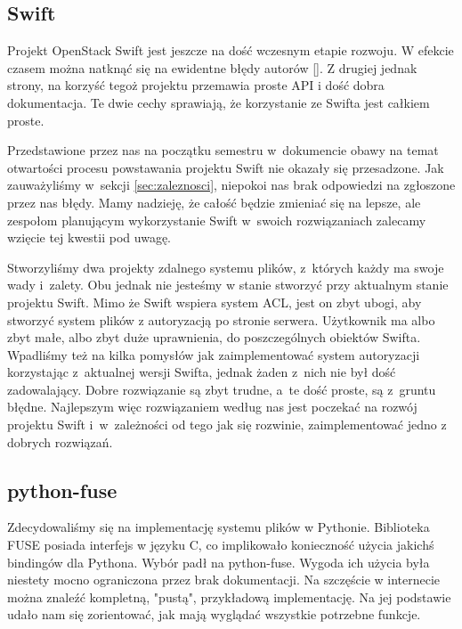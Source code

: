 \subsection{Swift}

Projekt OpenStack Swift jest jeszcze na dość wczesnym etapie rozwoju. W
efekcie czasem można natknąć się na ewidentne błędy autorów []. Z drugiej jednak strony, na korzyść tegoż projektu przemawia proste
API i dość dobra dokumentacja. Te dwie cechy sprawiają, że korzystanie ze
Swifta jest całkiem proste.

Przedstawione przez nas na początku semestru w~dokumencie \cite{jano-anal-atech}
obawy na temat otwartości procesu powstawania projektu Swift nie okazały się
przesadzone. Jak zauważyliśmy w~sekcji \ref{sec:zaleznosci}, niepokoi nas brak
odpowiedzi na zgłoszone przez nas błędy. Mamy nadzieję, że całość będzie
zmieniać się na lepsze, ale zespołom planującym wykorzystanie Swift w~swoich
rozwiązaniach zalecamy wzięcie tej kwestii pod uwagę.

Stworzyliśmy dwa projekty zdalnego systemu plików, z~których każdy ma swoje
wady i~zalety. Obu jednak nie jesteśmy w stanie stworzyć przy aktualnym stanie
projektu Swift. Mimo że Swift wspiera system ACL, jest on zbyt ubogi, aby
stworzyć system plików z autoryzacją po stronie serwera. Użytkownik ma albo zbyt
małe, albo zbyt duże uprawnienia, do poszczególnych obiektów Swifta. Wpadliśmy
też na kilka pomysłów jak zaimplementować system autoryzacji korzystając
z~aktualnej wersji Swifta, jednak żaden z~nich nie był dość zadowalający. Dobre
rozwiązanie są zbyt trudne, a~te dość proste, są z~gruntu błędne. Najlepszym
więc rozwiązaniem według nas jest poczekać na rozwój projektu Swift
i~w~zależności od tego jak się rozwinie, zaimplementować jedno z dobrych
rozwiązań.

\subsection{python-fuse}

Zdecydowaliśmy się na implementację systemu plików w Pythonie. Biblioteka FUSE
posiada interfejs w języku C, co implikowało konieczność użycia jakichś
bindingów dla Pythona. Wybór padł na python-fuse. Wygoda ich użycia była
niestety mocno ograniczona przez brak dokumentacji. Na szczęście w internecie
można znaleźć kompletną, "pustą", przykładową implementację. Na jej podstawie
udało nam się zorientować, jak mają wyglądać wszystkie potrzebne funkcje.


